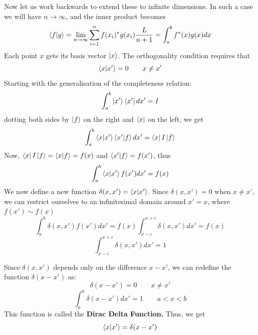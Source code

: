 \documentclass[12pt,a4paper]{report}
\begin{document}
Now let us work backwards to extend these to infinite dimensions. In such a case we will have $n\to \infty$, and the inner product becomes
\begin{equation*}
    \bra{f}\ket{g} = \lim_{n\to\infty}\sum_{i=1}^n f(x_i)^* g(x_i) \frac{L}{n+1} = \int_{a}^{b} f^*(x) g(x) dx
\end{equation*}
Each point $x$ gets its basis vector $\ket{x}$. The orthogonality condition requires that
\begin{equation*}
    \bra{x}\ket{x'} = 0 \qquad x\neq x'
\end{equation*}
Starting with the generalisation of the completeness relation:
\begin{equation*}
    \int_{a}^b \ket{x'}\bra{x'}dx' = I
\end{equation*}
dotting both sides by $\ket{f}$ on the right and $\bra{x}$ on the left, we get
\begin{equation*}
    \int_{a}^b \bra{x}\ket{x'}\bra{x'}\ket{f}dx' = \bra{x}I\ket{f}
\end{equation*}
Now, $\bra{x}I\ket{f} = \bra{x}\ket{f} = f(x)$ and $\bra{x'}\ket{f} = f(x')$, thus
\begin{equation*}
    \int_{a}^b \bra{x}\ket{x'}f(x')dx' = f(x)
\end{equation*}
We now define a new function $\delta(x, x') = \bra{x}\ket{x'}$. Since $\delta(x, x') = 0$ when $x \neq x'$, we can restrict ourselves to an infinitesimal domain around $x'=x$, where $f(x') \sim f(x)$
\begin{equation*}
    \int_{a}^b \delta(x, x')f(x')dx' = f(x) \int_{x-\varepsilon}^{x+\varepsilon}\delta(x, x') dx' = f(x)
\end{equation*}
\begin{equation*}
    \int_{x-\varepsilon}^{x+\varepsilon}\delta(x, x') dx' = 1
\end{equation*}

Since $\delta(x, x')$ depends only on the difference $x-x'$, we can redefine the function $\delta(x-x')$ as:
\begin{equation*}
    \delta(x-x') = 0 \qquad x\neq x'
\end{equation*}
\begin{equation*}
    \int_a^b \delta(x-x') dx' = 1 \qquad a < x < b
\end{equation*}
This function is called the \textbf{Dirac Delta Function.} Thus, we get
\begin{equation*}
    \bra{x}\ket{x'} = \delta(x-x')
\end{equation*}
\end{document}
